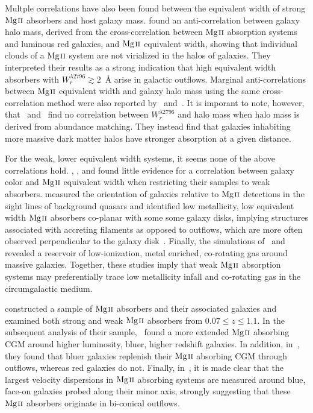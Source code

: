 \documentclass[iop,apj,numberedappendix,appendixfloats,twocolappendix]{emulateapj}
\begin{document}
Multple correlations have also been found between the equivalent width of strong ${\hbox{{\rm Mg}\kern 0.1em{\sc ii}}}$ absorbers and host galaxy mass. \cite{Bouche2006} found an anti-correlation between galaxy halo mass, derived from the cross-correlation between ${\hbox{{\rm Mg}\kern 0.1em{\sc ii}}}$ absorption systems and luminous red galaxies, and ${\hbox{{\rm Mg}\kern 0.1em{\sc ii}}}$ equivalent width, showing that individual clouds of a ${\hbox{{\rm Mg}\kern 0.1em{\sc ii}}}$ system are not virialized in the halos of galaxies. They interpreted their results as a strong indication that high equivalent width absorbers with $W_r^{\lambda2796} \gtrsim 2$~{\AA} arise in galactic outflows. Marginal anti-correlations between ${\hbox{{\rm Mg}\kern 0.1em{\sc ii}}}$ equivalent width and galaxy halo mass using the same cross-correlation method were also reported by~\cite{Gauthier2009} and~\cite{Lundgren2009}. It is imporant to note, however, that~\cite{Churchill2013letter} and~\cite{MAGIICAT3} find no correlation between $W_r^{\lambda2796}$ and halo mass when halo mass is derived from abundance matching. They instead find that galaxies inhabiting more massive dark matter halos have stronger absorption at a given distance.

For the weak, lower equivalent width systems, it seems none of the above correlations hold. \cite{Chen2010b}, \cite{Kacprzak2011}, and \cite{Lovegrove2011} found little evidence for a correlation between galaxy color and ${\hbox{{\rm Mg}\kern 0.1em{\sc ii}}}$ equivalent width when restricting their samples to weak absorbers. \cite{Kacprzak2011} measured the orientation of galaxies relative to ${\hbox{{\rm Mg}\kern 0.1em{\sc ii}}}$ detections in the sight lines of background quasars and identified low metallicity, low equivalent width ${\hbox{{\rm Mg}\kern 0.1em{\sc ii}}}$ absorbers co-planar with some some galaxy disks, implying structures associated with accreting filaments as opposed to outflows, which are more often observed perpendicular to the galaxy disk~\citep{Bordoloi2011,Kacprzak2012-PA,Bouche2012}. Finally, the simulations of~\cite{Stewart2011} and~\cite{Ford2013mass} revealed a reservoir of low-ionization, metal enriched, co-rotating gas around massive galaxies. Together, these studies imply that weak ${\hbox{{\rm Mg}\kern 0.1em{\sc ii}}}$ absorption systems may preferentially trace low metallicity infall and co-rotating gas in the circumgalactic medium.

\cite{MAGIICAT1} constructed a sample of ${\hbox{{\rm Mg}\kern 0.1em{\sc ii}}}$ absorbers and their associated galaxies and examined both strong and weak ${\hbox{{\rm Mg}\kern 0.1em{\sc ii}}}$ absorbers from $0.07 \le z \le 1.1$. In the subsequent analysis of their sample,~\cite{MAGIICAT2} found a more extended ${\hbox{{\rm Mg}\kern 0.1em{\sc ii}}}$ absorbing CGM around higher luminosity, bluer, higher redshift galaxies. In addition, in~\cite{MAGIICAT4}, they found that bluer galaxies replenish their ${\hbox{{\rm Mg}\kern 0.1em{\sc ii}}}$ absorbing CGM through outflows, whereas red galaxies do not. Finally, in~\cite{MAGIICAT5}, it is made clear that the largest velocity dispersions in ${\hbox{{\rm Mg}\kern 0.1em{\sc ii}}}$ absorbing systems are measured around blue, face-on galaxies probed along their minor axis, strongly suggesting that these ${\hbox{{\rm Mg}\kern 0.1em{\sc ii}}}$ absorbers originate in bi-conical outflows.
\end{document}
